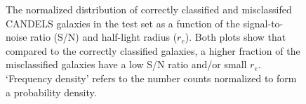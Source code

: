 \begin{figure}[htb]
	\begin{center}
  \end{center}
  \caption{The normalized distribution of correctly classified and misclassifed CANDELS galaxies in the test set as a function of the signal-to-noise ratio (S/N) and half-light radius ($r_e$). Both plots show that compared to the correctly classified galaxies, a higher fraction of the misclassified galaxies have a low S/N ratio and/or small $r_e$. `Frequency density' refers to the number counts normalized to form a probability density.}
  \label{fig:candels_misclf}
\end{figure}


